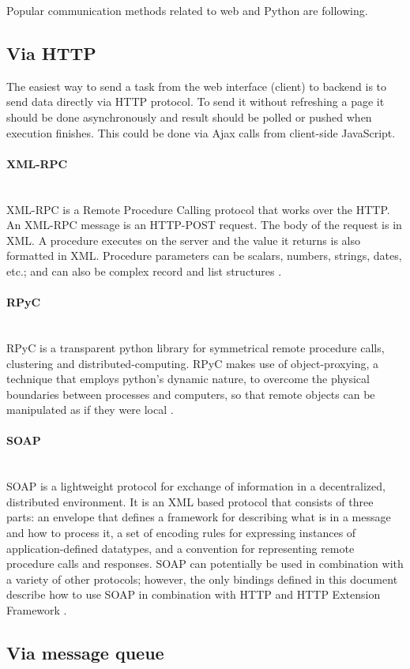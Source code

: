 \documentclass[thesis=B,english]{FITthesis}[2013/04/26]
\newcommand{\myparagraph}[1]{\paragraph{#1}\mbox{}\\}
\begin{document}
Popular communication methods related to web and Python are following.

\subsection{Via HTTP}

The easiest way to send a task from the web interface (client) to backend is to send data directly via HTTP protocol. To send it without refreshing a page it should be done asynchronously and result should be polled or pushed when execution finishes. This could be done via Ajax calls from client-side JavaScript.


\myparagraph{XML-RPC}

XML-RPC is a Remote Procedure Calling protocol that works over the HTTP. An XML-RPC message is an HTTP-POST request. The body of the request is in XML. A procedure executes on the server and the value it returns is also formatted in XML. Procedure parameters can be scalars, numbers, strings, dates, etc.; and can also be complex record and list structures \cite{xmlrpc}.

\myparagraph{RPyC}

RPyC is a transparent python library for symmetrical remote procedure calls, clustering and distributed-computing. RPyC makes use of object-proxying, a technique that employs python’s dynamic nature, to overcome the physical boundaries between processes and computers, so that remote objects can be manipulated as if they were local \cite{rpyc}.

\myparagraph{SOAP}

SOAP is a lightweight protocol for exchange of information in a decentralized, distributed environment. It is an XML based protocol that consists of three parts: an envelope that defines a framework for describing what is in a message and how to process it, a set of encoding rules for expressing instances of application-defined datatypes, and a convention for representing remote procedure calls and responses. SOAP can potentially be used in combination with a variety of other protocols; however, the only bindings defined in this document describe how to use SOAP in combination with HTTP and HTTP Extension Framework \cite{soap}.

\subsection{Via message queue}
\end{document}
